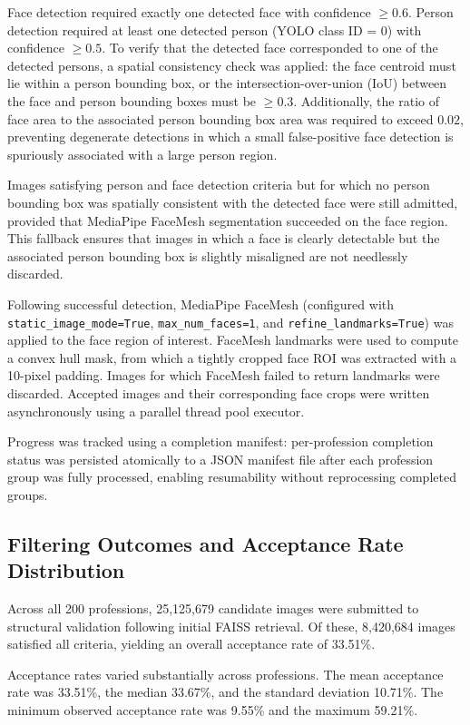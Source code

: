Face detection required exactly one detected face with confidence $\geq 0.6$. Person detection required at least one detected person (YOLO class ID = 0) with confidence $\geq 0.5$. To verify that the detected face corresponded to one of the detected persons, a spatial consistency check was applied: the face centroid must lie within a person bounding box, or the intersection-over-union (IoU) between the face and person bounding boxes must be $\geq 0.3$. Additionally, the ratio of face area to the associated person bounding box area was required to exceed $0.02$, preventing degenerate detections in which a small false-positive face detection is spuriously associated with a large person region.

Images satisfying person and face detection criteria but for which no person bounding box was spatially consistent with the detected face were still admitted, provided that MediaPipe FaceMesh segmentation succeeded on the face region. This fallback ensures that images in which a face is clearly detectable but the associated person bounding box is slightly misaligned are not needlessly discarded.

Following successful detection, MediaPipe FaceMesh (configured with \texttt{static\_image\_mode=True}, \texttt{max\_num\_faces=1}, and \texttt{refine\_landmarks=True}) was applied to the face region of interest. FaceMesh landmarks were used to compute a convex hull mask, from which a tightly cropped face ROI was extracted with a 10-pixel padding. Images for which FaceMesh failed to return landmarks were discarded. Accepted images and their corresponding face crops were written asynchronously using a parallel thread pool executor.

Progress was tracked using a completion manifest: per-profession completion status was persisted atomically to a JSON manifest file after each profession group was fully processed, enabling resumability without reprocessing completed groups.

\subsection{Filtering Outcomes and Acceptance Rate Distribution}

Across all 200 professions, 25{,}125{,}679 candidate images were submitted to structural validation following initial FAISS retrieval. Of these, 8{,}420{,}684 images satisfied all criteria, yielding an overall acceptance rate of 33.51\%.

Acceptance rates varied substantially across professions. The mean acceptance rate was 33.51\%, the median 33.67\%, and the standard deviation 10.71\%. The minimum observed acceptance rate was 9.55\% and the maximum 59.21\%.

